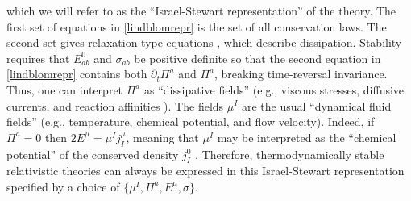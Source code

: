 \documentclass[aps,prl,singlecolumn,nofootinbib]{revtex4-2}
\theoremstyle{definition}
\theoremstyle{theorem}
\begin{document}
which we will refer to as the ``Israel-Stewart representation'' of the theory. The first set of equations in \eqref{lindblomrepr} is the set of all conservation laws. The second set gives relaxation-type equations \cite{Jou_Extended}, which describe dissipation. Stability requires that $E^0_{ab}$ and $\sigma_{ab}$ be positive definite so that the second equation in \eqref{lindblomrepr} contains both $\partial_t \Pi^a$ and $\Pi^a$, breaking time-reversal invariance. Thus, one can interpret $\Pi^a$ as ``dissipative fields'' \cite{LindblomRelaxation1996} (e.g., viscous stresses, diffusive currents, and reaction affinities \cite{PrigoginebookModernThermodynamics2014}). The fields $\mu^I$ are the usual ``dynamical fluid fields'' \cite{LindblomRelaxation1996} (e.g., temperature, chemical potential, and flow velocity). Indeed, if $\Pi^a=0$ then  $2E^\mu=\mu^I j_I^\mu$, meaning that $\mu^I$ may be interpreted as the ``chemical potential'' of the conserved density  $j_I^0$   \cite{GavassinoCasmir2022,Pathria2011}. 
Therefore, thermodynamically stable relativistic theories can always be expressed in this Israel-Stewart representation specified by a choice of $\{ \mu^I,\Pi^a,E^\mu,\sigma \}$.


\end{document}
